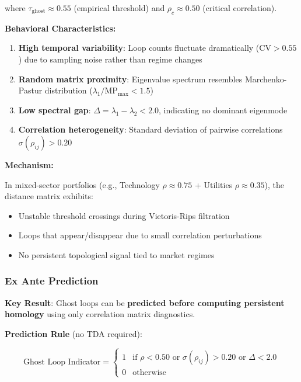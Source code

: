 where $\tau_{\text{ghost}} \approx 0.55$ (empirical threshold) and $\rho_c \approx 0.50$ (critical correlation).

\textbf{Behavioral Characteristics:}

\begin{enumerate}
\item \textbf{High temporal variability}: Loop counts fluctuate dramatically ($\text{CV} > 0.55$) due to sampling noise rather than regime changes

\item \textbf{Random matrix proximity}: Eigenvalue spectrum resembles Marchenko-Pastur distribution ($\lambda_1 / \text{MP}_{\max} < 1.5$)

\item \textbf{Low spectral gap}: $\Delta = \lambda_1 - \lambda_2 < 2.0$, indicating no dominant eigenmode

\item \textbf{Correlation heterogeneity}: Standard deviation of pairwise correlations $\sigma(\rho_{ij}) > 0.20$
\end{enumerate}

\textbf{Mechanism:}

In mixed-sector portfolios (e.g., Technology $\rho \approx 0.75$ + Utilities $\rho \approx 0.35$), the distance matrix exhibits:
\begin{itemize}
\item Unstable threshold crossings during Vietoris-Rips filtration
\item Loops that appear/disappear due to small correlation perturbations
\item No persistent topological signal tied to market regimes
\end{itemize}

\subsubsection{Ex Ante Prediction}

\textbf{Key Result}: Ghost loops can be \textbf{predicted before computing persistent homology} using only correlation matrix diagnostics.

\textbf{Prediction Rule} (no TDA required):

\begin{equation}
\text{Ghost Loop Indicator} =
\begin{cases}
1 & \text{if } \rho < 0.50 \text{ or } \sigma(\rho_{ij}) > 0.20 \text{ or } \Delta < 2.0 \\
0 & \text{otherwise}
\end{cases}
\end{equation}

